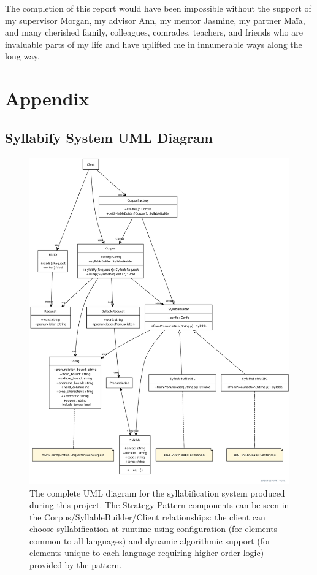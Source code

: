 \documentclass[11pt]{article}
\begin{document}
The completion of this report would have been impossible without the support of my supervisor Morgan, my advisor Ann, my mentor Jasmine, my partner Ma\"ia, and many cherished family, colleagues, comrades, teachers, and friends who are invaluable parts of my life and have uplifted me in innumerable ways along the long way.

\newpage
\section{Appendix}
\subsection{Syllabify System UML Diagram}
\begin{figure}[h]
  \centering
  \includegraphics[scale=0.3]{UMLdiag.png}
  \caption{The complete UML diagram for the syllabification system produced during this project. The Strategy Pattern components can be seen in the Corpus/SyllableBuilder/Client relationships: the client can choose syllabification at runtime using configuration (for elements common to all languages) and dynamic algorithmic support (for elements unique to each language requiring higher-order logic) provided by the pattern.}
  \label{fig:UMLdiag}
\end{figure}

\newpage

\vskip 0.2in

\end{document}
